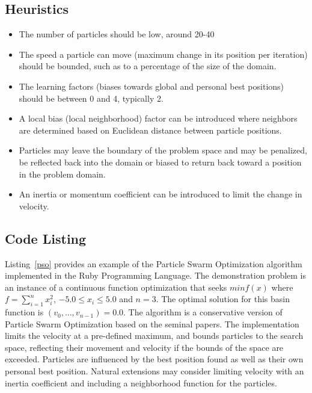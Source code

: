 \subsection{Heuristics}
\begin{itemize}
	\item The number of particles should be low, around 20-40
	\item The speed a particle can move (maximum change in its position per iteration) should be bounded, such as to a percentage of the size of the domain.
	\item The learning factors (biases towards global and personal best positions) should be between 0 and 4, typically 2.
	\item A local bias (local neighborhood) factor can be introduced where neighbors are determined based on Euclidean distance between particle positions.
	\item Particles may leave the boundary of the problem space and may be penalized, be reflected back into the domain or biased to return back toward a position in the problem domain. 
	\item An inertia or momentum coefficient can be introduced to limit the change in velocity.
\end{itemize}

\subsection{Code Listing}
Listing~\ref{pso} provides an example of the Particle Swarm Optimization algorithm implemented in the Ruby Programming Language. 
The demonstration problem is an instance of a continuous function optimization that seeks $min f(x)$ where $f=\sum_{i=1}^n x_{i}^2$, $-5.0\leq x_i \leq 5.0$ and $n=3$. The optimal solution for this basin function is $(v_0,\ldots,v_{n-1})=0.0$.
The algorithm is a conservative version of Particle Swarm Optimization based on the seminal papers. The implementation limits the velocity at a pre-defined maximum, and bounds particles to the search space, reflecting their movement and velocity if the bounds of the space are exceeded. Particles are influenced by the best position found as well as their own personal best position. Natural extensions may consider limiting velocity with an inertia coefficient and including a neighborhood function for the particles.

